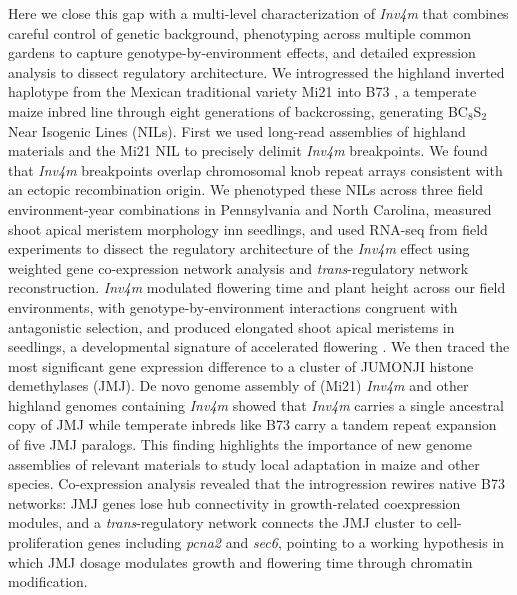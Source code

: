 \documentclass[9pt,twocolumn,twoside]{rilabRxiv}
\newcommand{\invfour}{\textit{Inv4m}\xspace}
\begin{document}
Here we close this gap with a multi-level characterization of \invfour that combines careful control of genetic background, phenotyping across multiple common gardens to capture genotype-by-environment effects, and detailed expression analysis to dissect regulatory architecture.
We introgressed the highland inverted haplotype from the Mexican traditional variety Mi21 \citep{Hayano-Kanashiro2009-ao} into B73 \citep{Schnable2009-jq}, a temperate maize inbred line through eight generations of backcrossing, generating BC$_8$S$_2$ Near Isogenic Lines (NILs).
First we used long-read assemblies of highland materials and the Mi21 NIL to precisely delimit \invfour breakpoints. 
We found that \invfour breakpoints overlap chromosomal knob repeat arrays consistent with an ectopic recombination origin.
We phenotyped these NILs across three field environment-year combinations in Pennsylvania and North Carolina, measured shoot apical meristem morphology inn seedlings, and used RNA-seq from field experiments  to dissect the regulatory architecture of the \invfour effect using weighted gene co-expression network analysis and \textit{trans}-regulatory network reconstruction. 
\invfour modulated flowering time and plant height across our field environments, with genotype-by-environment interactions congruent with antagonistic selection, and produced elongated shoot apical meristems in seedlings, a developmental signature of accelerated flowering \citep{danilevskaya2008, wu2008, leiboff2015, thompson2015}.
We then traced the most significant gene expression difference to a cluster of JUMONJI histone demethylases (JMJ).
De novo genome assembly of (Mi21) \invfour and other highland genomes containing \invfour showed that \invfour carries a single ancestral copy of JMJ while temperate inbreds like B73 carry a tandem repeat expansion of five JMJ paralogs.
This finding highlights the importance of new genome assemblies of relevant materials to study local adaptation in maize and other species.
Co-expression analysis revealed that the introgression rewires native B73 networks: JMJ genes lose hub connectivity in growth-related coexpression modules, and a \textit{trans}-regulatory network connects the JMJ cluster to cell-proliferation genes including \textit{pcna2} and \textit{sec6}, pointing to a working hypothesis in which JMJ dosage modulates growth and flowering time through chromatin modification.

\end{document}
